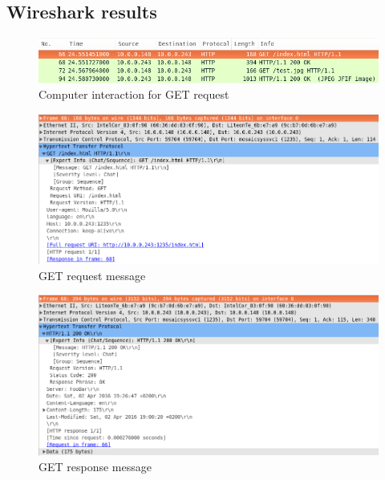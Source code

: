 \documentclass[10pt,twocolumn]{witseiepaper}
\begin{document}
	\subsection{Wireshark results} %
	\label{sub:wireshark_results}
	
		\begin{figure}[h!]
			\centering
			\includegraphics[width=\columnwidth]{resources/get_html}
			\caption{Computer interaction for GET request}
			\label{fig:basic_get}
		\end{figure}
		
		\begin{figure}[h!]
			\centering
			\includegraphics[width=\columnwidth]{resources/message_get_html}
			\caption{GET request message}
			\label{fig:basic_get_message}
		\end{figure}
		
		\begin{figure}[h!]
			\centering
			\includegraphics[width=\columnwidth]{resources/message_get_response_html}
			\caption{GET response message}
			\label{fig:basic_get_response}
		\end{figure}
		
\end{document}
